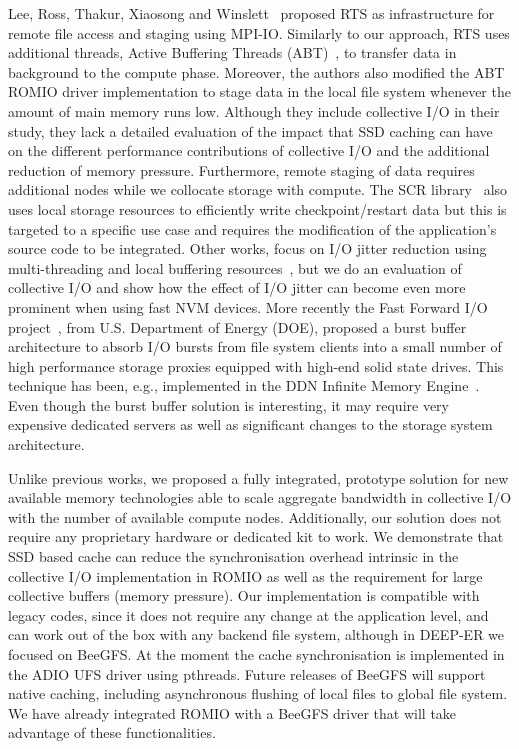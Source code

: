 Lee, Ross, Thakur, Xiaosong and Winslett~\cite{LeeRTXW04} proposed RTS as infrastructure for remote file access and staging using MPI-IO. Similarly to our approach, RTS uses additional threads, Active Buffering Threads (ABT)~\cite{XiaosongWLS03}, to transfer data in background to the compute phase. Moreover, the authors also modified the ABT ROMIO driver implementation to stage data in the local file system whenever the amount of main memory runs low. Although they include collective I/O in their study, they lack a detailed evaluation of the impact that SSD caching can have on the different performance contributions of collective I/O and the additional reduction of memory pressure. Furthermore, remote staging of data requires additional nodes while we collocate storage with compute. The SCR library~\cite{SCR} also uses local storage resources to efficiently write checkpoint/restart data but this is targeted to a specific use case and requires the modification of the application's source code to be integrated. Other works, focus on I/O jitter reduction using multi-threading and local buffering resources~\cite{DorierACSO12}, but we do an evaluation of collective I/O and show how the effect of I/O jitter can become even more prominent when using fast NVM devices. More recently the Fast Forward I/O project~\cite{fastforward}, from U.S. Department of Energy (DOE), proposed a burst buffer architecture to absorb I/O bursts from file system clients into a small number of high performance storage proxies equipped with high-end solid state drives. This technique has been, e.g., implemented in the DDN Infinite Memory Engine~\cite{DDN}. Even though the burst buffer solution is interesting, it may require very expensive dedicated servers as well as significant changes to the storage system architecture. 

Unlike previous works, we proposed a fully integrated, prototype solution for new available memory technologies able to scale aggregate bandwidth in collective I/O with the number of available compute nodes. Additionally, our solution does not require any proprietary hardware or dedicated kit to work. We demonstrate that SSD based cache can reduce the synchronisation overhead intrinsic in the collective I/O implementation in ROMIO as well as the requirement for large collective buffers (memory pressure). Our implementation is compatible with legacy codes, since it does not require any change at the application level, and can work out of the box with any backend file system, although in DEEP-ER we focused on BeeGFS. At the moment the cache synchronisation is implemented in the ADIO UFS driver using pthreads. Future releases of BeeGFS will support native caching, including asynchronous flushing of local files to global file system. We have already integrated ROMIO with a BeeGFS driver that will take advantage of these functionalities.
